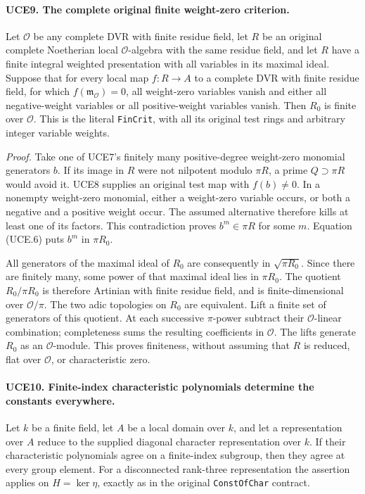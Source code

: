 \documentclass[11pt,a4paper]{article}
\numberwithin{equation}{section}
\theoremstyle{remark}\newtheorem{remark}[theorem]{Remark}
\begin{document}
\paragraph{UCE9. The complete original finite weight-zero criterion.}
\label{claim:UCE9}
Let \(\mathcal O\) be any complete DVR with finite residue field,
let \(R\) be an original complete Noetherian local
\(\mathcal O\)-algebra with the same residue field, and let
\(R\) have a finite integral weighted presentation with all
variables in its maximal ideal.  Suppose that for every local map
\(f:R\to A\) to a complete DVR with finite residue field, for
which \(f(\mathfrak m_{\mathcal O})=0\), all weight-zero
variables vanish and either all negative-weight variables or all
positive-weight variables vanish.  Then \(R_0\) is finite over
\(\mathcal O\).  This is the literal \texttt{Fin\allowbreak Crit}, with all
its original test rings and arbitrary integer variable weights.

\emph{Proof.}
Take one of UCE7's finitely many positive-degree weight-zero
monomial generators \(b\).  If its image in \(R\) were not
nilpotent modulo \(\pi R\), a prime \(Q\supset\pi R\)
would avoid it.  UCE8 supplies an original test map with
\(f(b)\ne0\).  In a nonempty weight-zero monomial, either a
weight-zero variable occurs, or both a negative and a positive
weight occur.  The assumed alternative therefore kills at least
one of its factors.  This contradiction proves
\(b^m\in\pi R\) for some \(m\).
Equation (UCE.6) puts \(b^m\) in \(\pi R_0\).

All generators of the maximal ideal of \(R_0\) are consequently
in \(\sqrt{\pi R_0}\).  Since there are finitely many, some
power of that maximal ideal lies in \(\pi R_0\).  The quotient
\(R_0/\pi R_0\) is therefore Artinian with finite residue field,
and is finite-dimensional over \(\mathcal O/\pi\).
The two adic topologies on \(R_0\) are equivalent.  Lift a finite
set of generators of this quotient.  At each successive
\(\pi\)-power subtract their \(\mathcal O\)-linear combination;
completeness sums the resulting coefficients in \(\mathcal O\).
The lifts generate \(R_0\) as an \(\mathcal O\)-module.
This proves finiteness, without assuming that \(R\) is reduced,
flat over \(\mathcal O\), or characteristic zero.

\paragraph{UCE10. Finite-index characteristic polynomials determine the constants everywhere.}
\label{claim:UCE10}
Let \(k\) be a finite field, let \(A\) be a local domain over
\(k\), and let a representation over \(A\) reduce to the supplied
diagonal character representation over \(k\).  If their
characteristic polynomials agree on a finite-index subgroup, then
they agree at every group element.  For a disconnected rank-three
representation the assertion applies on \(H=\ker\eta\), exactly
as in the original \texttt{Const\allowbreak Of\allowbreak Char} contract.
\end{document}

